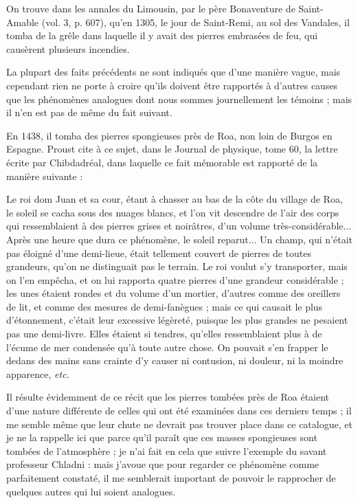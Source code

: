 \documentclass[a4paper, 12pt, oneside, french]{article}
\begin{document}
On trouve dans les annales du Limousin, par le père Bonaventure de Saint-Amable (vol. 3, p. 607), qu'en 1305, le jour de Saint-Remi, au sol des Vandales, il tomba de la grêle dans laquelle il y avait des pierres embrasées de feu, qui causèrent plusieurs incendies.

La plupart des faits précédents ne sont indiqués que d'une manière vague, mais cependant rien ne porte à croire qu'ils doivent être rapportés à d'autres causes que les phénomènes analogues dont nous sommes journellement les témoins ; mais il n'en est pas de même du fait suivant.

En 1438, il tomba des pierres spongieuses près de Roa, non loin de Burgos en Espagne. Proust cite à ce sujet, dans le Journal de physique, tome 60, la lettre écrite par Chibdadréal, dans laquelle ce fait mémorable est rapporté de la manière suivante :

\og Le roi dom Juan et sa cour, étant à chasser au bas de la côte du village de Roa, le soleil se cacha sous des nuages blancs, et l'on vit descendre de l'air des corps qui ressemblaient à des pierres grises et noirâtres, d'un volume très-considérable... Après une heure que dura ce phénomène, le soleil reparut... Un champ, qui n'était pas éloigné d'une demi-lieue, était tellement couvert de pierres de toutes grandeurs, qu'on ne distinguait pas le terrain. Le roi voulut s'y transporter, mais on l'en empêcha, et on lui rapporta quatre pierres d'une grandeur considérable ; les unes étaient rondes et du volume d'un mortier, d'autres comme des oreillers de lit, et comme des mesures de demi-fanègues ; mais ce qui causait le plus d'étonnement, c'était leur excessive légèreté, puisque les plus grandes ne pesaient pas une demi-livre. Elles étaient si tendres, qu'elles ressemblaient plus à de l'écume de mer condensée qu'à toute autre chose. On pouvait s'en frapper le dedans des mains sans crainte d'y causer ni contusion, ni douleur, ni la moindre apparence, \emph{etc.} \fg

Il résulte évidemment de ce récit que les pierres tombées près de Roa étaient d'une nature différente de celles qui ont été examinées dans ces derniers temps ; il me semble même que leur chute ne devrait pas trouver place dans ce catalogue, et je ne la rappelle ici que parce qu'il paraît que ces masses spongieuses sont tombées de l'atmosphère ; je n'ai fait en cela que suivre l'exemple du savant professeur Chladni : mais j'avoue que pour regarder ce phénomène comme parfaitement constaté, il me semblerait important de pouvoir le rapprocher de quelques autres qui lui soient analogues.
\end{document}
